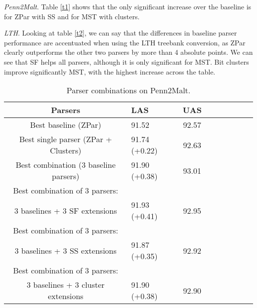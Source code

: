 \documentclass[11pt]{article}
\begin{document}
\emph{Penn2Malt}. Table \ref{t1} shows that the only significant increase over the baseline is for ZPar with SS and for MST with clusters.

\emph{LTH}. Looking at table \ref{t2}, we can say that the differences in baseline parser performance are accentuated when using the LTH treebank conversion, as ZPar clearly outperforms the other two parsers by more than 4 absolute points. We can see that SF helps all parsers, although it is only significant for MST. Bit clusters improve significantly MST, with the highest increase across the table.  


\begin{table}[t]
\centering
\scriptsize
\begin{tabular}{ |c||l|c|c|c|c|c|c|c|} \hline 
{\bf Parsers}&{\bf LAS} &{\bf UAS } \\ 
\hline \hline
Best baseline (ZPar) & 91.52 & 92.57  \\ \hline 
Best single parser (ZPar + Clusters) & 91.74 (+0.22) & 92.63  \\ \hline 
Best combination (3 baseline parsers) & 91.90 (+0.38) & 93.01   \\  \hline 
Best combination of 3 parsers:  &   &   \\  
 3 baselines + 3 SF extensions & 91.93 (+0.41)  &  92.95   \\ \hline 
Best combination of 3 parsers:  &   &   \\  
 3 baselines + 3 SS extensions & 91.87 (+0.35)  &  92.92   \\ \hline 
Best combination of 3 parsers:  &   &   \\  
 3 baselines + 3 cluster extensions & 91.90 (+0.38)  &  92.90   \\ \hline 
\end{tabular}
\\
\caption{\label{t3} Parser combinations on Penn2Malt.}
 \end{table}
\end{document}
